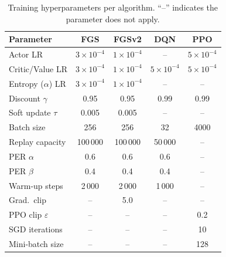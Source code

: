 \begin{table}[ht]
  \centering
  \caption{Training hyperparameters per algorithm. ``--'' indicates the parameter does not apply.}
  \label{tab:hyperparams}
  \begin{tabular}{lcccc}
    \hline
    Parameter              & FGS              & FGSv2            & DQN              & PPO              \\
    \hline
    Actor LR               & $3\times10^{-4}$ & $1\times10^{-4}$ & --               & $5\times10^{-4}$ \\
    Critic/Value LR        & $3\times10^{-4}$ & $1\times10^{-4}$ & $5\times10^{-4}$ & $5\times10^{-4}$ \\
    Entropy ($\alpha$) LR  & $3\times10^{-4}$ & $1\times10^{-4}$ & --               & --               \\
    Discount $\gamma$      & 0.95             & 0.95             & 0.99             & 0.99             \\
    Soft update $\tau$     & 0.005            & 0.005            & --               & --               \\
    Batch size             & 256              & 256              & 32               & 4000             \\
    Replay capacity        & 100\,000         & 100\,000         & 50\,000          & --               \\
    PER $\alpha$           & 0.6              & 0.6              & 0.6              & --               \\
    PER $\beta$            & 0.4              & 0.4              & 0.4              & --               \\
    Warm-up steps          & 2\,000           & 2\,000           & 1\,000           & --               \\
    Grad.\ clip            & --               & 5.0              & --               & --               \\
    PPO clip $\varepsilon$ & --               & --               & --               & 0.2              \\
    SGD iterations         & --               & --               & --               & 10               \\
    Mini-batch size        & --               & --               & --               & 128              \\
    \hline
  \end{tabular}
\end{table}

